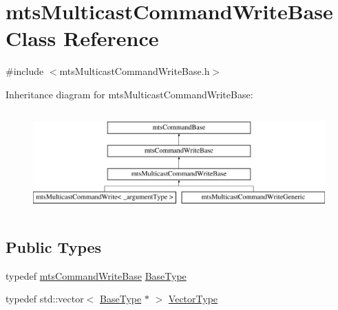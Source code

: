 \hypertarget{classmts_multicast_command_write_base}{}\section{mts\+Multicast\+Command\+Write\+Base Class Reference}
\label{classmts_multicast_command_write_base}


{\ttfamily \#include $<$mts\+Multicast\+Command\+Write\+Base.\+h$>$}

Inheritance diagram for mts\+Multicast\+Command\+Write\+Base\+:\begin{figure}[H]
\begin{center}
\leavevmode
\includegraphics[height=3.957597cm]{d0/dcb/classmts_multicast_command_write_base}
\end{center}
\end{figure}
\subsection*{Public Types}
\begin{DoxyCompactItemize}
\item 
typedef \hyperlink{classmts_command_write_base}{mts\+Command\+Write\+Base} \hyperlink{classmts_multicast_command_write_base_a062bc9363d14a3f801a45fee24772a97}{Base\+Type}
\item 
typedef std\+::vector$<$ \hyperlink{classmts_command_write_base_a5d78c8590cfc73fa29d93b3678cba199}{Base\+Type} $\ast$ $>$ \hyperlink{classmts_multicast_command_write_base_a25953a3da11d172a87774cfebe55eaa9}{Vector\+Type}
\end{DoxyCompactItemize}
